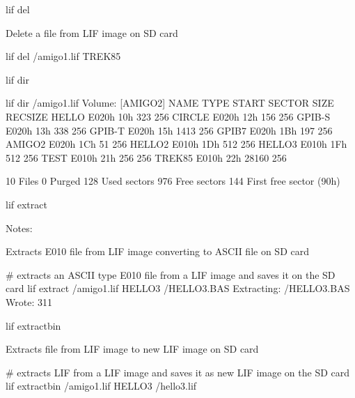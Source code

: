 \begin{DoxyItemize}
\begin{DoxyItemize}
\begin{DoxyPre}
\begin{DoxyItemize}
\item lif del
\begin{DoxyItemize}
\item Delete a file from L\+IF image on SD card 
\begin{DoxyPre}
        lif del /amigo1.lif TREK85
      \end{DoxyPre}

\end{DoxyItemize}
\item lif dir 
\begin{DoxyPre}
        lif dir /amigo1.lif
        Volume: [AMIGO2]
        NAME         TYPE   START SECTOR        SIZE    RECSIZE
        HELLO       E020h            10h         323        256
        CIRCLE      E020h            12h         156        256
        GPIB-S      E020h            13h         338        256
        GPIB-T      E020h            15h        1413        256
        GPIB7       E020h            1Bh         197        256
        AMIGO2      E020h            1Ch          51        256
        HELLO2      E010h            1Dh         512        256
        HELLO3      E010h            1Fh         512        256
        TEST        E010h            21h         256        256
        TREK85      E010h            22h       28160        256\end{DoxyPre}



\begin{DoxyPre}              10 Files
               0 Purged
             128 Used sectors
             976 Free sectors
             144 First free sector (90h)
      \end{DoxyPre}

\item lif extract
\begin{DoxyItemize}
\item Notes\+:
\begin{DoxyItemize}
\item Extracts E010 file from L\+IF image converting to A\+S\+C\+II file on SD card 
\begin{DoxyPre}
         \# extracts an ASCII type E010 file from a LIF image and saves it on the SD card
         lif extract /amigo1.lif HELLO3 /HELLO3.BAS
         Extracting: /HELLO3.BAS
         Wrote:      311
      \end{DoxyPre}

\end{DoxyItemize}
\end{DoxyItemize}
\item lif extractbin
\begin{DoxyItemize}
\item Extracts file from L\+IF image to new L\+IF image on SD card 
\begin{DoxyPre}
         \# extracts LIF from a LIF image and saves it as new LIF image on the SD card
         lif extractbin /amigo1.lif HELLO3 /hello3.lif
      \end{DoxyPre}


\end{DoxyItemize}
\end{DoxyItemize}
\end{DoxyPre}
\end{DoxyItemize}
\end{DoxyItemize}
